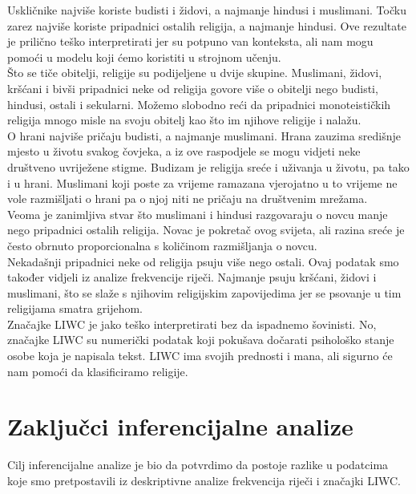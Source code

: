 \documentclass[times,utf8,zavrsni]{fer}
\begin{document}
Uskličnike najviše koriste budisti i židovi, a najmanje hindusi i muslimani. Točku zarez najviše koriste pripadnici ostalih religija, a najmanje hindusi. Ove rezultate je prilično teško interpretirati jer su potpuno van konteksta, ali nam mogu pomoći u modelu koji ćemo koristiti u strojnom učenju. \\

Što se tiče obitelji, religije su podijeljene u dvije skupine. Muslimani, židovi, kršćani i bivši pripadnici neke od religija govore više o obitelji nego budisti, hindusi, ostali i sekularni. Možemo slobodno reći da pripadnici monoteističkih religija mnogo misle na svoju obitelj kao što im njihove religije i nalažu. \\

O hrani najviše pričaju budisti, a najmanje muslimani. Hrana zauzima središnje mjesto u životu svakog čovjeka, a iz ove raspodjele se mogu vidjeti neke društveno uvriježene stigme. Budizam je religija sreće i uživanja u životu, pa tako i u hrani. Muslimani koji poste za vrijeme ramazana vjerojatno u to vrijeme ne vole razmišljati o hrani pa o njoj niti ne pričaju na društvenim mrežama. \\

Veoma je zanimljiva stvar što muslimani i hindusi razgovaraju o novcu manje nego pripadnici ostalih religija. Novac je pokretač ovog svijeta, ali razina sreće je često obrnuto proporcionalna s količinom razmišljanja o novcu. \\

Nekadašnji pripadnici neke od religija psuju više nego ostali. Ovaj podatak smo također vidjeli iz analize frekvencije riječi. Najmanje psuju kršćani, židovi i muslimani, što se slaže s njihovim religijskim zapovijedima jer se psovanje u tim religijama smatra grijehom. \\

Značajke LIWC je jako teško interpretirati bez da ispadnemo šovinisti. No, značajke LIWC su numerički podatak koji pokušava dočarati psihološko stanje osobe koja je napisala tekst. LIWC ima svojih prednosti i mana, ali sigurno će nam pomoći da klasificiramo religije. \\




\clearpage
\section{Zaključci inferencijalne analize}

Cilj inferencijalne analize je bio da potvrdimo da postoje razlike u podatcima koje smo pretpostavili iz deskriptivne analize frekvencija riječi i značajki LIWC. \\
\end{document}
